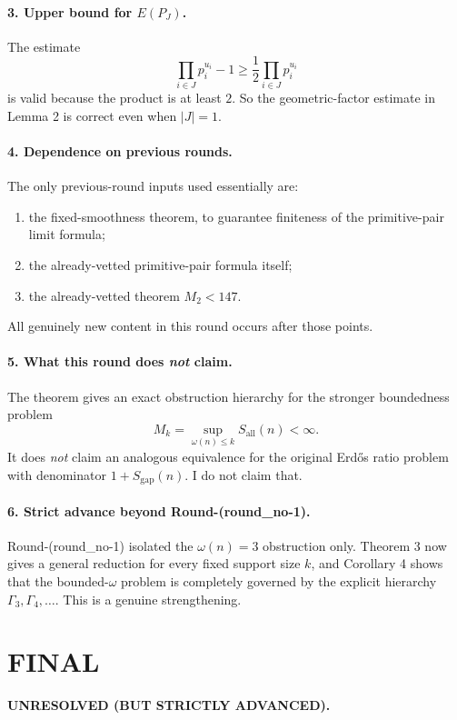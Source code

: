 \paragraph{3. Upper bound for \(E(P_J)\).}
The estimate
\[
\prod_{i\in J} p_i^{u_i}-1\ge \frac12\prod_{i\in J}p_i^{u_i}
\]
is valid because the product is at least \(2\). So the geometric-factor estimate in Lemma 2 is correct even when \(|J|=1\).

\paragraph{4. Dependence on previous rounds.}
The only previous-round inputs used essentially are:
\begin{enumerate}
\item the fixed-smoothness theorem, to guarantee finiteness of the primitive-pair limit formula;
\item the already-vetted primitive-pair formula itself;
\item the already-vetted theorem \(M_2<147\).
\end{enumerate}
All genuinely new content in this round occurs after those points.

\paragraph{5. What this round does \emph{not} claim.}
The theorem gives an exact obstruction hierarchy for the stronger boundedness problem
\[
M_k=\sup_{\omega(n)\le k}S_{\mathrm{all}}(n)<\infty.
\]
It does \emph{not} claim an analogous equivalence for the original Erd\H{o}s ratio problem with denominator \(1+S_{\mathrm{gap}}(n)\). I do not claim that.

\paragraph{6. Strict advance beyond Round-(round\_no-1).}
Round-(round\_no-1) isolated the \(\omega(n)=3\) obstruction only. Theorem 3 now gives a general reduction for every fixed support size \(k\), and Corollary 4 shows that the bounded-\(\omega\) problem is completely governed by the explicit hierarchy \(\Gamma_3,\Gamma_4,\dots\). This is a genuine strengthening.

\section{FINAL}

\textbf{UNRESOLVED (BUT STRICTLY ADVANCED).}

